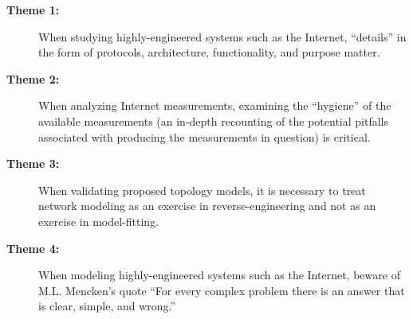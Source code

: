\vspace{5mm}

\begin{description}
\item[{\bf Theme 1:}] When studying highly-engineered systems such as
  the Internet, ``details'' in the form of protocols, architecture,
  functionality, and purpose matter.

\item[{\bf Theme 2:}] When analyzing Internet measurements, examining
  the ``hygiene'' of the available measurements (\ie an in-depth
  recounting of the potential pitfalls associated with producing the
  measurements in question) is critical.

\item[{\bf Theme 3:}] When validating proposed topology models, it is
  necessary to treat network modeling as an exercise in
  reverse-engineering and not as an exercise in model-fitting.

\item[{\bf Theme 4:}] When modeling highly-engineered systems such as
  the Internet, beware of M.L. Mencken's quote ``For every complex
  problem there is an answer that is clear, simple, and wrong.''

\end{description}
